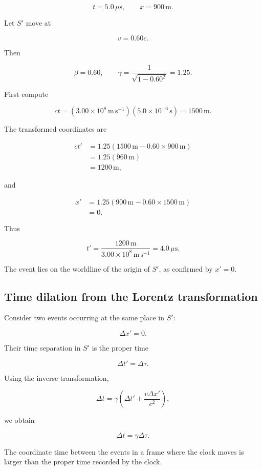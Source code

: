 \[
t=5.0\,\mu\mathrm{s},
\qquad
x=900\,\mathrm{m}.
\]

Let \(S'\) move at

\[
v=0.60c.
\]

Then

\[
\beta=0.60,
\qquad
\gamma=
\frac{1}{\sqrt{1-0.60^{2}}}
=1.25.
\]

First compute

\[
ct
=
(3.00\times10^{8}\,\mathrm{m\,s^{-1}})
(5.0\times10^{-6}\,\mathrm{s})
=
1500\,\mathrm{m}.
\]

The transformed coordinates are

\[
\begin{aligned}
ct'
&=
1.25(1500\,\mathrm{m}-0.60\times900\,\mathrm{m})\\
&=
1.25(960\,\mathrm{m})\\
&=
1200\,\mathrm{m},
\end{aligned}
\]

and

\[
\begin{aligned}
x'
&=
1.25(900\,\mathrm{m}-0.60\times1500\,\mathrm{m})\\
&=
0.
\end{aligned}
\]

Thus

\[
t'
=
\frac{1200\,\mathrm{m}}{3.00\times10^{8}\,\mathrm{m\,s^{-1}}}
=
4.0\,\mu\mathrm{s}.
\]

The event lies on the worldline of the origin of \(S'\), as confirmed by \(x'=0\).

\subsection{Time dilation from the Lorentz transformation}

Consider two events occurring at the same place in \(S'\):

\[
\Delta x'=0.
\]

Their time separation in \(S'\) is the proper time

\[
\Delta t'=\Delta\tau.
\]

Using the inverse transformation,

\[
\Delta t
=
\gamma\left(
\Delta t'
+
\frac{v\Delta x'}{c^{2}}
\right),
\]

we obtain

\[
\boxed{
\Delta t
=
\gamma\Delta\tau
}.
\]

The coordinate time between the events in a frame where the clock moves is larger than the proper time recorded by the clock.

